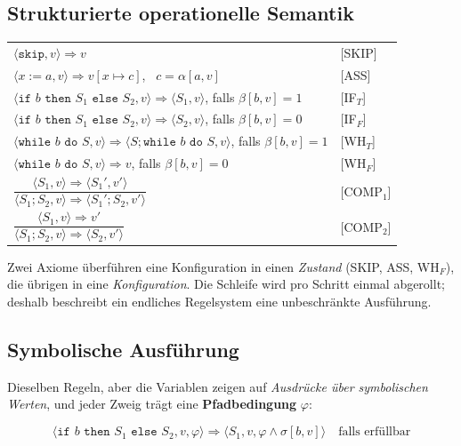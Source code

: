 \documentclass[12pt, a4paper]{article}
\begin{document}
\subsection{Strukturierte operationelle Semantik}

\begin{center}
\begin{tabular}{ll}
\hline
$\langle \texttt{skip}, v\rangle \Rightarrow v$ & [SKIP] \\
$\langle x := a, v\rangle \Rightarrow v[x \mapsto c]$, \ $c = \alpha[a,v]$ & [ASS] \\
$\langle \texttt{if } b \texttt{ then } S_1 \texttt{ else } S_2, v\rangle \Rightarrow \langle S_1, v\rangle$, falls $\beta[b,v]=1$ & [IF$_T$] \\
$\langle \texttt{if } b \texttt{ then } S_1 \texttt{ else } S_2, v\rangle \Rightarrow \langle S_2, v\rangle$, falls $\beta[b,v]=0$ & [IF$_F$] \\
$\langle \texttt{while } b \texttt{ do } S, v\rangle \Rightarrow \langle S; \texttt{while } b \texttt{ do } S, v\rangle$, falls $\beta[b,v]=1$ & [WH$_T$] \\
$\langle \texttt{while } b \texttt{ do } S, v\rangle \Rightarrow v$, falls $\beta[b,v]=0$ & [WH$_F$] \\
$\dfrac{\langle S_1, v\rangle \Rightarrow \langle S_1', v'\rangle}{\langle S_1;S_2, v\rangle \Rightarrow \langle S_1';S_2, v'\rangle}$ & [COMP$_1$] \\[10pt]
$\dfrac{\langle S_1, v\rangle \Rightarrow v'}{\langle S_1;S_2, v\rangle \Rightarrow \langle S_2, v'\rangle}$ & [COMP$_2$] \\
\hline
\end{tabular}
\end{center}

Zwei Axiome überführen eine Konfiguration in einen \emph{Zustand} (SKIP, ASS, WH$_F$),
die übrigen in eine \emph{Konfiguration}. Die Schleife wird pro Schritt einmal
abgerollt; deshalb beschreibt ein endliches Regelsystem eine unbeschränkte Ausführung.

\subsection{Symbolische Ausführung}

Dieselben Regeln, aber die Variablen zeigen auf \emph{Ausdrücke über symbolischen
Werten}, und jeder Zweig trägt eine \textbf{Pfadbedingung} $\varphi$:

\[
\langle \texttt{if } b \texttt{ then } S_1 \texttt{ else } S_2, v, \varphi\rangle
\Rightarrow \langle S_1, v, \varphi \wedge \sigma[b,v]\rangle
\quad\text{falls erfüllbar}
\]
\end{document}

